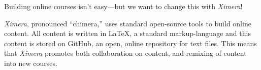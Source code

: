 \documentclass[11pt]{article}
\begin{document}
\vfill

Building online courses isn't easy---but we want to change this with \textsl{Ximera}!

\vfill

\textsl{Ximera}, pronounced ``chimera,'' uses standard open-source
tools to build online content. All content is written in \LaTeX, a
standard markup-language and this content is stored on GitHub, an
open, online repository for text files. This means that
\textsl{Ximera} promotes both collaboration on content, and remixing
of content into new courses.
\end{document}

